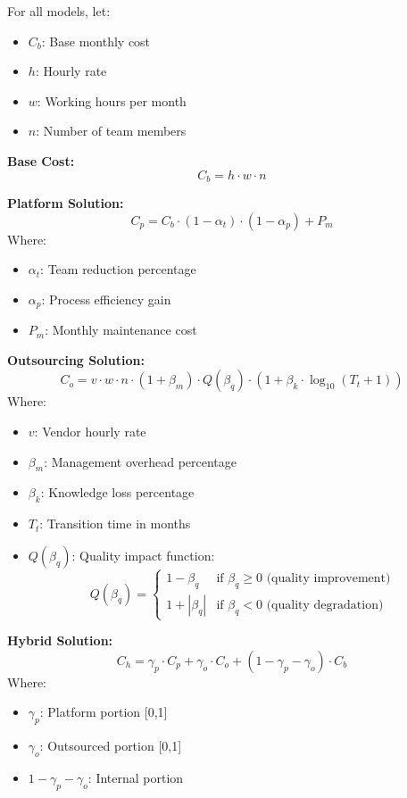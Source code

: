 \documentclass[12pt,a4paper]{article}
\newenvironment{definition}[1]
{\begin{mdframed}[style=definitionstyle,frametitle={Definition: #1}]}
{\end{mdframed}}
\begin{document}
\begin{definition}{Cost Calculation Formulas}
For all models, let:
\begin{itemize}
    \item $C_b$: Base monthly cost
    \item $h$: Hourly rate
    \item $w$: Working hours per month
    \item $n$: Number of team members
\end{itemize}

\textbf{Base Cost:}
\begin{equation}
    C_b = h \cdot w \cdot n
\end{equation}

\textbf{Platform Solution:}
\begin{equation}
    C_p = C_b \cdot (1 - \alpha_t) \cdot (1 - \alpha_p) + P_m
\end{equation}
Where:
\begin{itemize}
    \item $\alpha_t$: Team reduction percentage
    \item $\alpha_p$: Process efficiency gain
    \item $P_m$: Monthly maintenance cost
\end{itemize}

\textbf{Outsourcing Solution:}
\begin{equation}
    C_o = v \cdot w \cdot n \cdot (1 + \beta_m) \cdot Q(\beta_q) \cdot (1 + \beta_k \cdot \log_{10}(T_t + 1))
\end{equation}
Where:
\begin{itemize}
    \item $v$: Vendor hourly rate
    \item $\beta_m$: Management overhead percentage
    \item $\beta_k$: Knowledge loss percentage
    \item $T_t$: Transition time in months
    \item $Q(\beta_q)$: Quality impact function:
    \begin{equation}
        Q(\beta_q) = \begin{cases}
            1 - \beta_q & \text{if } \beta_q \geq 0 \text{ (quality improvement)} \\
            1 + |\beta_q| & \text{if } \beta_q < 0 \text{ (quality degradation)}
        \end{cases}
    \end{equation}
\end{itemize}

\textbf{Hybrid Solution:}
\begin{equation}
    C_h = \gamma_p \cdot C_p + \gamma_o \cdot C_o + (1 - \gamma_p - \gamma_o) \cdot C_b
\end{equation}
Where:
\begin{itemize}
    \item $\gamma_p$: Platform portion [0,1]
    \item $\gamma_o$: Outsourced portion [0,1]
    \item $1 - \gamma_p - \gamma_o$: Internal portion
\end{itemize}
\end{definition}
\end{document}
